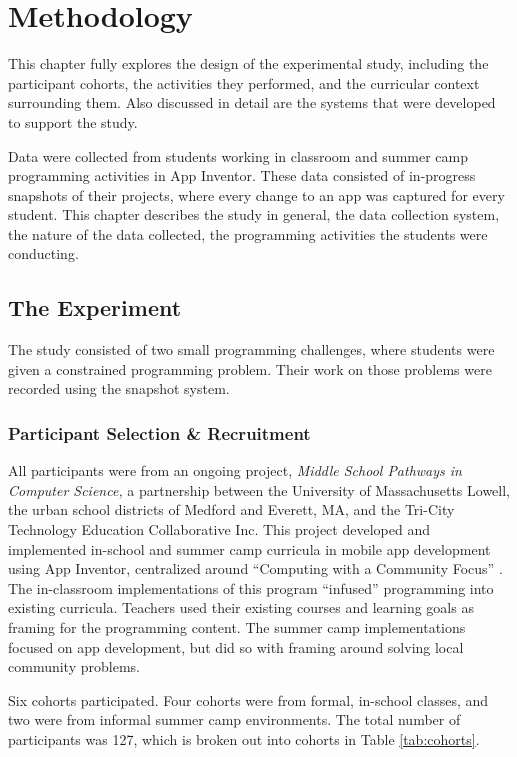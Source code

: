 \chapter{Methodology}

This chapter fully explores the design of the experimental study, including the participant cohorts, the activities they performed, and the curricular context surrounding them. Also discussed in detail are the systems that were developed to support the study.

Data were collected from students working in classroom and summer camp programming activities in App Inventor. These data consisted of in-progress snapshots of their projects, where every change to an app was captured for every student. This chapter describes the study in general, the data collection system, the nature of the data collected, the programming activities the students were conducting.


\section{The Experiment}

The study consisted of two small programming challenges, where students were given a constrained programming problem. Their work on those problems were recorded using the snapshot system.

\subsection{Participant Selection \& Recruitment} 

All participants were from an ongoing project, \emph{Middle School Pathways in Computer Science,} a partnership between the University of Massachusetts Lowell, the urban school districts of Medford and Everett, MA, and the Tri-City Technology Education Collaborative Inc. This project developed and implemented in-school and summer camp curricula in mobile app development using App Inventor, centralized around ``Computing with a Community Focus'' \citep{Ni-2016}. The in-classroom implementations of this program ``infused'' programming into existing curricula. Teachers used their existing courses and learning goals as framing for the programming content. \label{sec:infusion} The summer camp implementations focused on app development, but did so with framing around solving local community problems.

Six cohorts participated. Four cohorts were from formal, in-school classes, and two were from informal summer camp environments. The total number of participants was 127, which is broken out into cohorts in Table \ref{tab:cohorts}.

